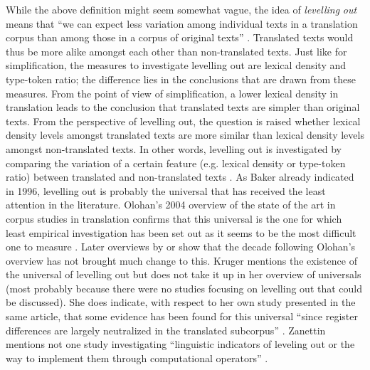 While the above definition might seem somewhat vague, the idea of \textit{levelling} \textit{out} means that “we can expect less variation among individual texts in a translation corpus than among those in a corpus of original texts” \citep[177]{baker_corpus-based_1996}. Translated texts would thus be more alike amongst each other than non-translated texts. Just like for simplification, the measures to investigate levelling out are lexical density and type-token ratio; the difference lies in the conclusions that are drawn from these measures. From the point of view of simplification, a lower lexical density in translation leads to the conclusion that translated texts are simpler than original texts. From the perspective of levelling out, the question is raised whether lexical density levels amongst translated texts are more similar than lexical density levels amongst non-translated texts. In other words, levelling out is investigated by comparing the variation of a certain feature (e.g. lexical density or type-token ratio) between translated and non-translated texts \citep[184]{baker_corpus-based_1996}. As Baker already indicated in 1996, levelling out is probably the universal that has received the least attention in the literature. Olohan’s 2004 overview of the state of the art in corpus studies in translation confirms that this universal is the one for which least empirical investigation has been set out as it seems to be the most difficult one to measure \citep[100]{Olohan2004}. Later overviews by \citet{Kruger2012} or \citet{zanettin_corpus_2013} show that the decade following Olohan’s overview has not brought much change to this. Kruger mentions the existence of the universal of levelling out but does not take it up in her overview of universals (most probably because there were no studies focusing on levelling out that could be discussed). She does indicate, with respect to her own study presented in the same article, that some evidence has been found for this universal “since register differences are largely neutralized in the translated subcorpus” \citep[369]{Kruger2012}. Zanettin mentions not one study investigating “linguistic indicators of leveling out or the way to implement them through computational operators” \citep[23]{zanettin_corpus_2013}.


